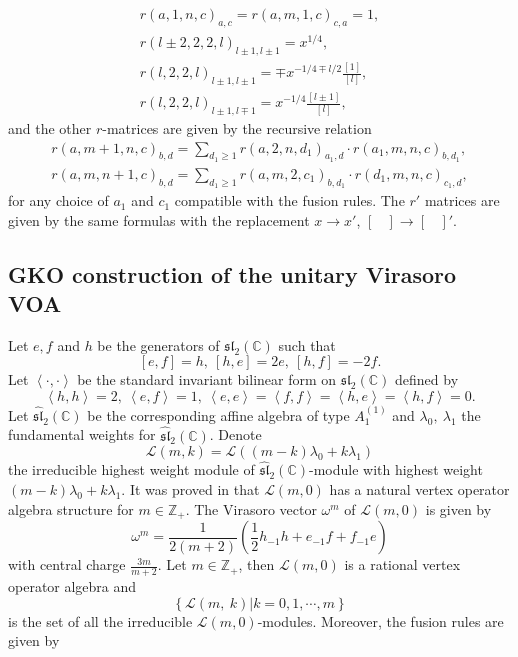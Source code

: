 \documentclass{article}
\begin{document}
	\begin{gather}
		r\left(a,1,n,c\right)_{a,c}=r\left(a,m,1,c\right)_{c,a}=1,\nonumber \\
		r\left(l\pm2,2,2,l\right)_{l\pm1,l\pm1}=x^{1/4},\nonumber \\
		r\left(l,2,2,l\right)_{l\pm1,l\pm1}=\mp x^{-1/4\mp l/2}\frac{\left[1\right]}{\left[l\right]},\nonumber \\
		r\left(l,2,2,l\right)_{l\pm1,l\mp1}=x^{-1/4}\frac{\left[l\pm1\right]}{\left[l\right]},\label{FFK 2.20}
	\end{gather}
	and the other $r$-matrices are given by the recursive relation
	\begin{gather}
		r\left(a,m+1,n,c\right)_{b,d}=\sum_{d_{1}\ge1}r\left(a,2,n,d_{1}\right)_{a_{1},d}\cdot r\left(a_{1},m,n,c\right)_{b,d_{1}},\nonumber \\
		r\left(a,m,n+1,c\right)_{b,d}=\sum_{d_{1}\ge1}r\left(a,m,2,c_{1}\right)_{b,d_{1}}\cdot r\left(d_{1},m,n,c\right)_{c_{1},d},\label{FFK 2.21}
	\end{gather}
	for any choice of $a_{1}$ and $c_{1}$ compatible with the fusion
	rules. The $r'$ matrices are given by the same formulas with the
	replacement $x\to x'$, $\left[\ \ \ \ \right]\to\left[\ \ \ \ \right]'.$
	
	\subsection{GKO construction of the unitary Virasoro VOA}
	
	Let $e,f$ and $h$ be the generators of $\mathfrak{sl}_{2}(\mathbb{C})$
	such that
	\[
	\left[e,f\right]=h,\ \left[h,e\right]=2e,\ \left[h,f\right]=-2f.
	\]
	Let $\left\langle \cdot,\cdot\right\rangle $ be the standard invariant
	bilinear form on $\mathfrak{sl}_{2}(\mathbb{C})$ defined by
	\[
	\left\langle h,h\right\rangle =2,\ \left\langle e,f\right\rangle =1,\ \left\langle e,e\right\rangle =\left\langle f,f\right\rangle =\left\langle h,e\right\rangle =\left\langle h,f\right\rangle =0.
	\]
	Let $\hat{\mathfrak{sl}}_{2}\left(\mathbb{C}\right)$ be the corresponding
	affine algebra of type $A_{1}^{(1)}$ and $\lambda_{0},\ \lambda_{1}$
	the fundamental weights for $\hat{\mathfrak{sl}}_{2}\left(\mathbb{C}\right)$.
	Denote
	\[
	\mathcal{L}(m,k)=\mathcal{L}\left(\left(m-k\right)\lambda_{0}+k\lambda_{1}\right)
	\]
	the irreducible highest weight module of $\hat{\mathfrak{sl}}_{2}\left(\mathbb{C}\right)$-module
	with highest weight $\left(m-k\right)\lambda_{0}+k\lambda_{1}$. It
	was proved in \cite{FZ} that $\mathcal{L}\left(m,0\right)$ has a
	natural vertex operator algebra structure for $m\in\mathbb{Z}_{+}$.
	The Virasoro vector $\omega^{m}$ of $\mathcal{L}\left(m,0\right)$
	is given by
	\[
	\omega^{m}=\frac{1}{2\left(m+2\right)}\left(\frac{1}{2}h_{-1}h+e_{-1}f+f_{-1}e\right)
	\]
	with central charge $\frac{3m}{m+2}$. Let $m\in\mathbb{Z}_{+}$,
	then $\mathcal{L}\left(m,0\right)$ is a rational vertex operator
	algebra and
	$$\left\{ \mathcal{L}\left(m,\ k\right)|k=0,1,\cdots,m\right\}$$
	is the set of all the irreducible 
	$\mathcal{L}\left(m,0\right)$-modules.
	Moreover, the fusion rules are given by
	
\end{document}
